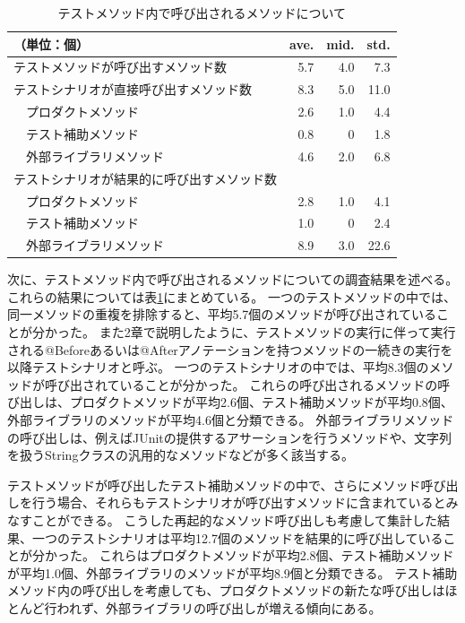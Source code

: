\documentclass[conference]{IEEEtran}
\begin{document}
\begin{table}[t]
  \caption{テストメソッド内で呼び出されるメソッドについて}
  \label{tab:called}
  \centering
  \begin{tabular}{lrrr} 
    \hline
   （単位：個） & ave. & mid. & std. \\ \hline
    テストメソッドが呼び出すメソッド数& 5.7 & 4.0 & 7.3 \\
    テストシナリオが直接呼び出すメソッド数 & 8.3 & 5.0 & 11.0 \\
    　プロダクトメソッド & 2.6 & 1.0 & 4.4 \\
    　テスト補助メソッド & 0.8 & 0 & 1.8 \\
    　外部ライブラリメソッド & 4.6 & 2.0 & 6.8 \\
    テストシナリオが結果的に呼び出すメソッド数 &  &  &  \\
    　プロダクトメソッド & 2.8 & 1.0 & 4.1 \\
    　テスト補助メソッド & 1.0 & 0 & 2.4 \\
    　外部ライブラリメソッド & 8.9 & 3.0 &22.6 \\ \hline
  \end{tabular}
\end{table}

次に、テストメソッド内で呼び出されるメソッドについての調査結果を述べる。
これらの結果については表\ref{tab:called}にまとめている。
一つのテストメソッドの中では、同一メソッドの重複を排除すると、平均5.7個のメソッドが呼び出されていることが分かった。
また2章で説明したように、テストメソッドの実行に伴って実行される@Beforeあるいは@Afterアノテーションを持つメソッドの一続きの実行を以降テストシナリオと呼ぶ。
一つのテストシナリオの中では、平均8.3個のメソッドが呼び出されていることが分かった。
これらの呼び出されるメソッドの呼び出しは、プロダクトメソッドが平均2.6個、テスト補助メソッドが平均0.8個、外部ライブラリのメソッドが平均4.6個と分類できる。
外部ライブラリメソッドの呼び出しは、例えばJUnitの提供するアサーションを行うメソッドや、文字列を扱うStringクラスの汎用的なメソッドなどが多く該当する。

テストメソッドが呼び出したテスト補助メソッドの中で、さらにメソッド呼び出しを行う場合、それらもテストシナリオが呼び出すメソッドに含まれているとみなすことができる。
こうした再起的なメソッド呼び出しも考慮して集計した結果、一つのテストシナリオは平均12.7個のメソッドを結果的に呼び出していることが分かった。
これらはプロダクトメソッドが平均2.8個、テスト補助メソッドが平均1.0個、外部ライブラリのメソッドが平均8.9個と分類できる。
テスト補助メソッド内の呼び出しを考慮しても、プロダクトメソッドの新たな呼び出しはほとんど行われず、外部ライブラリの呼び出しが増える傾向にある。
\end{document}
